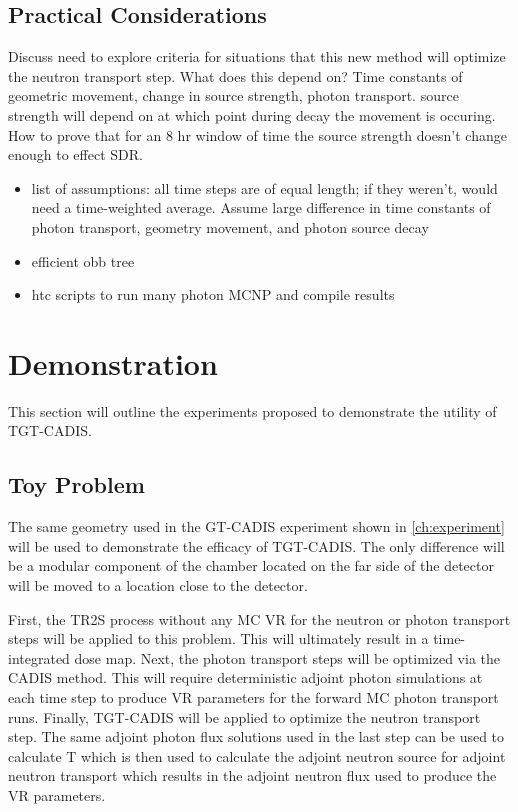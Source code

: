 \subsection{Practical Considerations}
Discuss need to explore criteria for situations that this new method will
optimize the neutron transport step.  What does this depend on?  Time constants
of geometric movement, change in source strength, photon transport.  source
strength will depend on at which point during decay the movement is occuring.
How to prove that for an 8 hr window of time the source strength doesn't change
enough to effect SDR.
\begin{itemize}
		\item list of assumptions: all time steps are of equal length;
			if they weren't, would need a time-weighted average.
			Assume large difference in time constants of photon
			transport, geometry movement, and photon source decay
        \item efficient obb tree
	\item htc scripts to run many photon MCNP and compile results

\end{itemize}


\section{Demonstration} \label{sec:demo}
This section will outline the experiments proposed to demonstrate the utility
of TGT-CADIS.  

\subsection{Toy Problem}
The same geometry used in the GT-CADIS experiment shown in \ref{ch:experiment}
will be used to demonstrate the efficacy of TGT-CADIS.  The only difference
will be a modular component of the chamber located on the far side of the
detector will be moved to a location close to the detector.  

First, the TR2S process without any MC VR for the neutron or photon transport
steps will be applied to this problem.  This will ultimately result in a
time-integrated dose map.
Next, the photon transport steps will be optimized via the CADIS method.  This
will require deterministic adjoint photon simulations at each time step to
produce VR parameters for the forward MC photon transport runs.
Finally, TGT-CADIS will be applied to optimize the neutron transport step.  The
same adjoint photon flux solutions used in the last step can be used to
calculate T which is then used to calculate the adjoint neutron source for
adjoint neutron transport which results in the adjoint neutron flux used to
produce the VR parameters.

